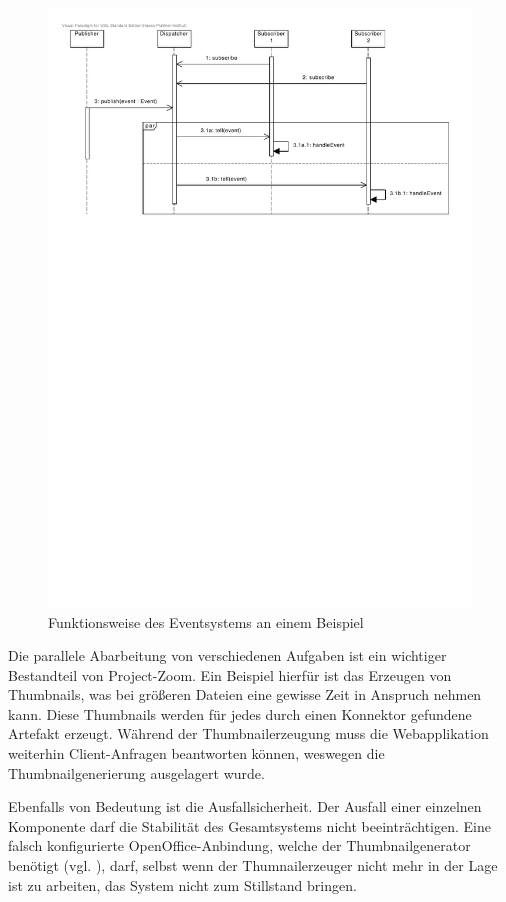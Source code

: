 \begin{figure}[h]  
  \centering     
  \includegraphics[width=1.0\textwidth]{img/eventsystem.pdf}  
   \caption{Funktionsweise des Eventsystems an einem Beispiel}   
  \label{fig:event-system} 
\end{figure}

Die parallele Abarbeitung von verschiedenen Aufgaben ist ein wichtiger Bestandteil von Project-Zoom. Ein Beispiel hierfür ist das Erzeugen von Thumbnails, was bei größeren Dateien eine gewisse Zeit in Anspruch nehmen kann. Diese Thumbnails werden für jedes durch einen Konnektor gefundene Artefakt erzeugt. Während der Thumbnailerzeugung muss die Webapplikation weiterhin Client-Anfragen beantworten können, weswegen die Thumbnailgenerierung ausgelagert wurde.

Ebenfalls von Bedeutung ist die Ausfallsicherheit. Der Ausfall einer einzelnen Komponente darf die Stabilität des Gesamtsystems nicht beeinträchtigen. Eine falsch konfigurierte OpenOffice-Anbindung, welche der Thumbnailgenerator benötigt (vgl. \cite{bp-dome}), darf, selbst wenn der Thumnailerzeuger nicht mehr in der Lage ist zu arbeiten, das System nicht zum Stillstand bringen.


